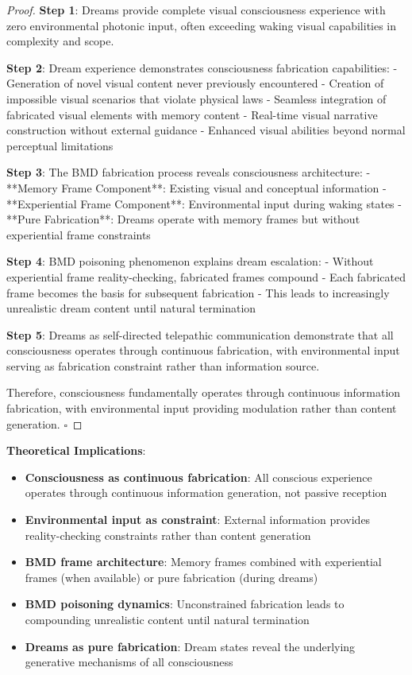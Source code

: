 \documentclass[12pt,a4paper]{article}
\begin{document}
\begin{proof}
\textbf{Step 1}: Dreams provide complete visual consciousness experience with zero environmental photonic input, often exceeding waking visual capabilities in complexity and scope.

\textbf{Step 2}: Dream experience demonstrates consciousness fabrication capabilities:
- Generation of novel visual content never previously encountered
- Creation of impossible visual scenarios that violate physical laws
- Seamless integration of fabricated visual elements with memory content
- Real-time visual narrative construction without external guidance
- Enhanced visual abilities beyond normal perceptual limitations

\textbf{Step 3}: The BMD fabrication process reveals consciousness architecture:
- **Memory Frame Component**: Existing visual and conceptual information
- **Experiential Frame Component**: Environmental input during waking states
- **Pure Fabrication**: Dreams operate with memory frames but without experiential frame constraints

\textbf{Step 4}: BMD poisoning phenomenon explains dream escalation:
- Without experiential frame reality-checking, fabricated frames compound
- Each fabricated frame becomes the basis for subsequent fabrication
- This leads to increasingly unrealistic dream content until natural termination

\textbf{Step 5}: Dreams as self-directed telepathic communication demonstrate that all consciousness operates through continuous fabrication, with environmental input serving as fabrication constraint rather than information source.

Therefore, consciousness fundamentally operates through continuous information fabrication, with environmental input providing modulation rather than content generation. $\square$
\end{proof}

\textbf{Theoretical Implications}:
\begin{itemize}
\item \textbf{Consciousness as continuous fabrication}: All conscious experience operates through continuous information generation, not passive reception
\item \textbf{Environmental input as constraint}: External information provides reality-checking constraints rather than content generation
\item \textbf{BMD frame architecture}: Memory frames combined with experiential frames (when available) or pure fabrication (during dreams)
\item \textbf{BMD poisoning dynamics}: Unconstrained fabrication leads to compounding unrealistic content until natural termination
\item \textbf{Dreams as pure fabrication}: Dream states reveal the underlying generative mechanisms of all consciousness
\end{itemize}
\end{document}
